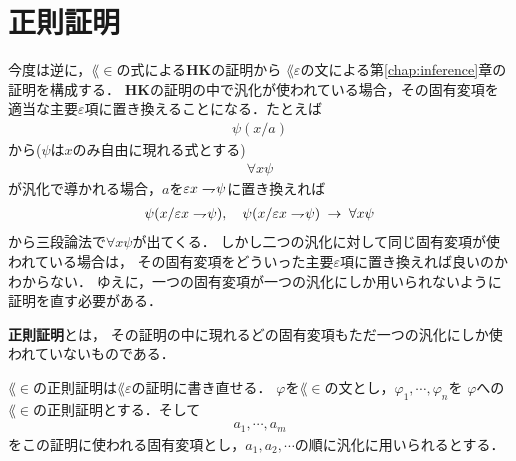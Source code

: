 \section{正則証明}
	今度は逆に，$\lang{\in}$の式による{\bf HK}の証明から
	$\lang{\varepsilon}$の文による第\ref{chap:inference}章の証明を構成する．
	{\bf HK}の証明の中で汎化が使われている場合，その固有変項を
	適当な主要$\varepsilon$項に置き換えることになる．たとえば
	\begin{align}
		\psi(x/a)
	\end{align}
	から($\psi$は$x$のみ自由に現れる式とする)
	\begin{align}
		\forall x \psi
	\end{align}
	が汎化で導かれる場合，$a$を$\varepsilon x \rightharpoondown\hspace{-0.25em} \psi$に置き換えれば
	\begin{align}
		\psi(x/\varepsilon x \rightharpoondown\hspace{-0.25em} \psi), 
		\quad \psi(x/\varepsilon x \rightharpoondown\hspace{-0.25em} \psi) \hspace{0.25em}\rightarrow\hspace{0.25em} \forall x \psi
	\end{align}
	から三段論法で$\forall x \psi$が出てくる．
	しかし二つの汎化に対して同じ固有変項が使われている場合は，
	その固有変項をどういった主要$\varepsilon$項に置き換えれば良いのかわからない．
	ゆえに，一つの固有変項が一つの汎化にしか用いられないように証明を直す必要がある．
	
	\begin{screen}
		\begin{metadfn}[正則証明]
			{\bf 正則証明}とは，
			その証明の中に現れるどの固有変項もただ一つの汎化にしか使われていないものである．
		\end{metadfn}
	\end{screen}
	
	\begin{screen}
		\begin{metathm}[どんな証明も正則化できる]
			
		\end{metathm}
	\end{screen}
	
	$\lang{\in}$の正則証明は$\lang{\varepsilon}$の証明に書き直せる．
	$\varphi$を$\lang{\in}$の文とし，$\varphi_{1},\cdots,\varphi_{n}$を
	$\varphi$への$\lang{\in}$の正則証明とする．そして
	\begin{align}
		a_{1},\cdots,a_{m}
	\end{align}
	をこの証明に使われる固有変項とし，$a_{1},a_{2},\cdots$の順に汎化に用いられるとする．
	
